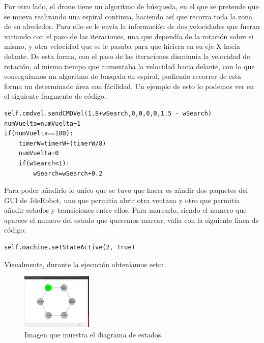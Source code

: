 \hspace{1cm} Por otro lado, el drone tiene un algoritmo de b\'usqueda, en el que se pretende que se mueva realizando una espiral continua, haciendo as\'i que recorra toda la zona de su alrededor. Para ello se le env\'ia la informaci\'on de dos velocidades que fueran variando con el paso de las iteraciones, una que depend\'ia de la rotaci\'on sobre si mismo, y otra velocidad que se le pasaba para que hiciera en su eje X hacia delante. De esta forma, con el paso de las iteraciones disminu\'ia la velocidad de rotaci\'on, al mismo tiempo que aumentaba la velocidad hacia delante, con lo que consegu\'iamos un algoritmo de busqeda en espiral, pudiendo recorrer de esta forma un determinado \'area con f\'acilidad. Un ejemplo de esto lo podemos ver en el siguiente fragmento de c\'odigo.

\begin{verbatim}
self.cmdvel.sendCMDVel(1.8+wSearch,0,0,0,0,1.5 - wSearch)
numVuelta=numVuelta+1
if(numVuelta==100):
    timerW=timerW+(timerW/8)
    numVuelta=0
    if(wSearch<1):
        wSearch=wSearch+0.2
\end{verbatim}

\hspace{1cm}	

\hspace{1cm} Para poder añadirlo lo unico que se tuvo que hacer es añadir dos paquetes del GUI de JdeRobot, uno que permitia abrir otra ventana y otro que permitia añadir estados y transiciones entre ellos. Para marcarlo, siendo el numero que aparece el numero del estado que queremos marcar, val\'ia con la siguiente linea de c\'odigo:

\begin{verbatim}
self.machine.setStateActive(2, True)
\end{verbatim}
	
Visualmente, durante la ejecuci\'on obten\'iamos esto:
\begin{figure}[ht]
	\centering
		\includegraphics[width=0.3\textwidth]{imgs/states.eps}
		\caption{Imagen que muestra el diagrama de estados.}
	\label{fig:k_Beacon1}
\end{figure}

